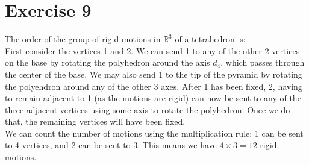\documentclass{article}
\newcommand{\R}{\mathbb{R}}
\begin{document}
    
    \section*{Exercise 9}
    The order of the group of rigid motions in $\R^3$ of a tetrahedron is: \\
    First consider the vertices 1 and 2.
    We can send 1 to any of the other 2 vertices on the base by rotating the
    polyhedron around the axis $d_4$, which passes through the center of
    the base. We may also send 1 to the tip of the pyramid by rotating the
    polyehdron around any of the other 3 axes.
    After 1 has been fixed, 2, having to remain adjacent to 1 (as the
    motions are rigid) can now be sent to any of the three adjacent vertices
    using some axis to rotate the polyhedron. Once we do that, the
    remaining vertices will have been fixed. \\
    We can count the number of motions using the multiplication rule:
    1 can be sent to 4 vertices, and 2 can be sent to 3. This means we
    have $4 \times 3 = 12$ rigid motions. 
\end{document}

